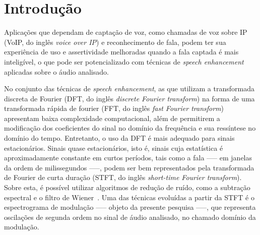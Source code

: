 
\chapter{Introdução}

Aplicações que dependam de captação de voz, como chamadas de voz sobre IP (VoIP,
 do inglês \textit{voice over IP}) e reconhecimento de fala, podem ter sua
 experiência de uso e assertividade melhoradas quando a fala captada é mais
 inteligível, o que pode ser potencializado com técnicas de \textit{speech
 enhancement} aplicadas sobre o áudio analisado.

No conjunto das técnicas de \textit{speech enhancement}, as que utilizam a
transformada discreta de Fourier (DFT, do inglês \textit{discrete Fourier
transform}) na forma de uma transformada rápida de fourier (FFT, do inglês
\textit{fast Fourier transform}) apresentam baixa complexidade computacional,
além de permitirem a modificação dos coeficientes do sinal no domínio da
frequência e sua ressíntese no domínio do tempo. Entretanto, o uso da DFT é mais
adequado para sinais estacionários. Sinais quase estacionários, isto é, sinais
cuja estatística é aproximadamente constante em curtos períodos, tais como a
fala —-- em janelas da ordem de milissegundos —--, podem ser bem representados
pela transformada de Fourier de curta duração (STFT, do inglês
\textit{short-time Fourier transform}). Sobre esta, é possível utilizar
algoritmos de redução de ruído, como a subtração espectral e o filtro de
Wiener~\cite{parchami2016}. Uma das técnicas evoluídas a partir da STFT é o
espectrograma de modulação —-- objeto da presente pesquisa —--, que representa
oscilações de segunda ordem no sinal de áudio analisado, no chamado domínio da
modulação.

